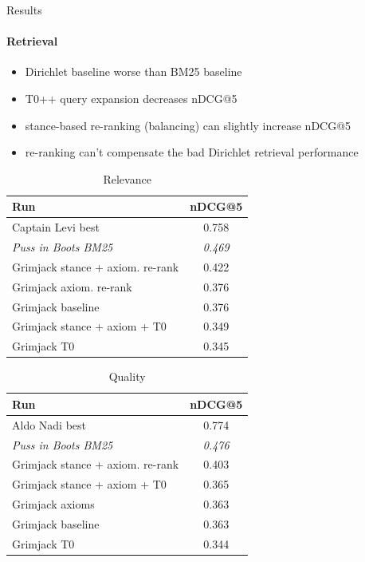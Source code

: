 \documentclass[english]{mlutalk}
\begin{document}
\begin{frame}{Results}
  \framesubtitle{Retrieval}
  \begin{itemize}
    \item Dirichlet baseline worse than BM25 baseline~\cite{BondarenkoFKSGBPBSWPH2022}
    \item T0++ query expansion decreases nDCG@5
    \item stance-based re-ranking (balancing) can slightly increase nDCG@5
    \item re-ranking can't compensate the bad Dirichlet retrieval performance
  \end{itemize}
  \begin{minipage}{0.49\linewidth}
    \begin{table}[t]
      \centering
      \scriptsize
      \caption{Relevance}
      \renewcommand{\tabcolsep}{5pt}
      \begin{tabular}{@{}lc@{}}
      \toprule
      \textbf{Run} & \textbf{nDCG@5} \\
      \midrule
      Captain Levi best~\cite{RanaGJCEHP2022} & 0.758 \\
      \textit{Puss in Boots BM25}~\cite{BondarenkoFKSGBPBSWPH2022} & \textit{0.469} \\
      Grimjack stance + axiom. re-rank & 0.422 \\
      Grimjack axiom.  re-rank & 0.376 \\
      Grimjack baseline & 0.376 \\
      Grimjack stance + axiom + T0 & 0.349 \\
      Grimjack T0 & 0.345 \\
      \bottomrule
      \end{tabular}
    \end{table}
  \end{minipage}
  \hfill
  \begin{minipage}{0.49\linewidth}
    \begin{table}[t]
      \centering
      \scriptsize
      \caption{Quality}
      \renewcommand{\tabcolsep}{5pt}
      \begin{tabular}{@{}lc@{}}
      \toprule
      \textbf{Run} & \textbf{nDCG@5} \\
      \midrule
      Aldo Nadi best~\cite{AbaAGMPVF2022} & 0.774 \\
      \textit{Puss in Boots BM25}~\cite{BondarenkoFKSGBPBSWPH2022} & \textit{0.476} \\
      Grimjack stance + axiom. re-rank & 0.403 \\
      Grimjack stance + axiom + T0 & 0.365 \\
      Grimjack axioms & 0.363 \\
      Grimjack baseline & 0.363 \\
      Grimjack T0 & 0.344 \\
      \bottomrule
      \end{tabular}
    \end{table}
  \end{minipage}
\end{frame}
\end{document}
